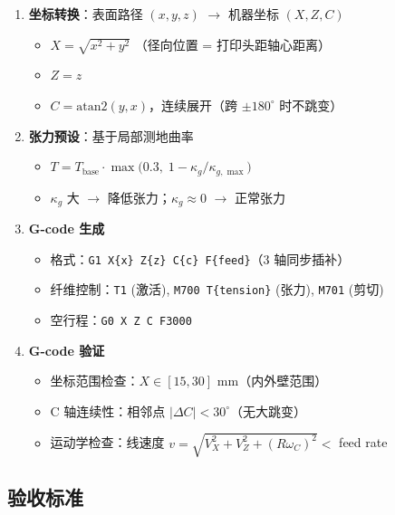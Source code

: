 \documentclass[11pt,a4paper]{article}
\begin{document}
\begin{enumerate}
\item \textbf{坐标转换}：表面路径 $(x,y,z)$ $\to$ 机器坐标 $(X,Z,C)$
\begin{itemize}[nosep]
\item $X = \sqrt{x^2 + y^2}$ （径向位置 = 打印头距轴心距离）
\item $Z = z$
\item $C = \text{atan2}(y, x)$，连续展开（跨 $\pm 180^\circ$ 时不跳变）
\end{itemize}

\item \textbf{张力预设}：基于局部测地曲率
\begin{itemize}[nosep]
\item $T = T_{\text{base}} \cdot \max\big(0.3,\; 1 - \kappa_g / \kappa_{g,\max}\big)$
\item $\kappa_g$ 大 $\to$ 降低张力；$\kappa_g \approx 0$ $\to$ 正常张力
\end{itemize}

\item \textbf{G-code 生成}
\begin{itemize}[nosep]
\item 格式：\texttt{G1 X\{x\} Z\{z\} C\{c\} F\{feed\}}（3 轴同步插补）
\item 纤维控制：\texttt{T1} (激活), \texttt{M700 T\{tension\}} (张力), \texttt{M701} (剪切)
\item 空行程：\texttt{G0 X Z C F3000}
\end{itemize}

\item \textbf{G-code 验证}
\begin{itemize}[nosep]
\item 坐标范围检查：$X \in [15, 30]$ mm（内外壁范围）
\item C 轴连续性：相邻点 $|\Delta C| < 30^\circ$（无大跳变）
\item 运动学检查：线速度 $v = \sqrt{V_X^2 + V_Z^2 + (R \omega_C)^2} <$ feed rate
\end{itemize}
\end{enumerate}

\subsection{验收标准}
\end{document}
